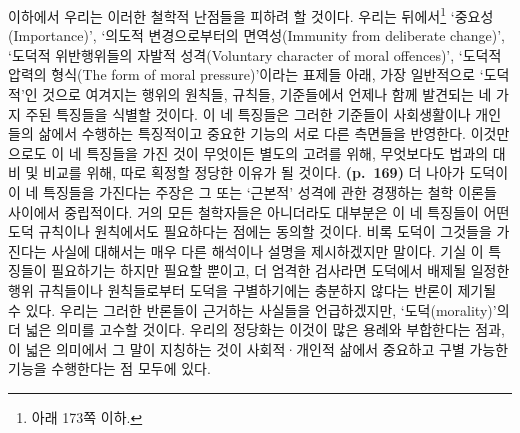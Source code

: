 이하에서 우리는 이러한 철학적 난점들을 피하려 할 것이다. 우리는
뒤에서\footnote{아래 173쪽 이하.} ‘중요성(Importance)’, ‘의도적
변경으로부터의 면역성(Immunity from deliberate change)’, ‘도덕적
위반행위들의 자발적 성격(Voluntary character of moral offences)’,
‘도덕적 압력의 형식(The form of moral pressure)’이라는 표제들 아래, 가장
일반적으로 ‘도덕적’인 것으로 여겨지는 행위의 원칙들, 규칙들, 기준들에서
언제나 함께 발견되는 네 가지 주된 특징들을 식별할 것이다. 이 네 특징들은
그러한 기준들이 사회생활이나 개인들의 삶에서 수행하는 특징적이고 중요한
기능의 서로 다른 측면들을 반영한다. 이것만으로도 이 네 특징들을 가진
것이 무엇이든 별도의 고려를 위해, 무엇보다도 법과의 대비 및 비교를 위해,
따로 획정할 정당한 이유가 될 것이다. \textbf{(p.~169)} 더 나아가 도덕이
이 네 특징들을 가진다는 주장은 그  또는 ‘근본적’
성격에 관한 경쟁하는 철학 이론들 사이에서 중립적이다. 거의 모든
철학자들은 아니더라도 대부분은 이 네 특징들이 어떤 도덕 규칙이나
원칙에서도 필요하다는 점에는 동의할 것이다. 비록 도덕이 그것들을
가진다는 사실에 대해서는 매우 다른 해석이나 설명을 제시하겠지만 말이다.
기실 이 특징들이 필요하기는 하지만  필요할 뿐이고, 더 엄격한
검사라면 도덕에서 배제될 일정한 행위 규칙들이나 원칙들로부터 도덕을
구별하기에는 충분하지 않다는 반론이 제기될 수 있다. 우리는 그러한
반론들이 근거하는 사실들을 언급하겠지만, ‘도덕(morality)’의 더 넓은
의미를 고수할 것이다. 우리의 정당화는 이것이 많은 용례와 부합한다는
점과, 이 넓은 의미에서 그 말이 지칭하는 것이 사회적·개인적 삶에서
중요하고 구별 가능한 기능을 수행한다는 점 모두에 있다.

